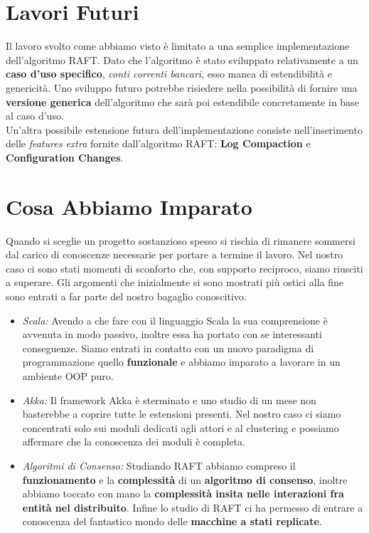 \section{Lavori Futuri}
  Il lavoro svolto come abbiamo visto è limitato a una semplice implementazione dell'algoritmo RAFT. Dato che l'algoritmo è stato sviluppato relativamente a un \textbf{caso d'uso specifico}, \textit{conti correnti bancari}, esso manca di estendibilità e genericità. Uno sviluppo futuro potrebbe risiedere nella possibilità di fornire una \textbf{versione generica} dell'algoritmo che sarà poi estendibile concretamente in base al caso d'uso.\\
  Un'altra possibile estensione futura dell'implementazione consiste nell'inserimento delle \textit{features extra} fornite dall'algoritmo RAFT: \textbf{Log Compaction} e \textbf{Configuration Changes}.

\section{Cosa Abbiamo Imparato}
  Quando si sceglie un progetto sostanzioso spesso si rischia di rimanere sommersi dal carico di conoscenze necessarie per portare a termine il lavoro. Nel nostro caso ci sono stati momenti di sconforto che, con supporto reciproco, siamo riusciti a superare. Gli argomenti che inizialmente si sono mostrati più ostici alla fine sono entrati a far parte del nostro bagaglio conoscitivo.
  \begin{itemize}
    \item{\emph{Scala:}}
    Avendo a che fare con il linguaggio Scala la sua comprensione è avvenuta in modo passivo, inoltre essa ha portato con se interessanti conseguenze. Siamo entrati in contatto con un nuovo paradigma di programmazione quello \textbf{funzionale} e abbiamo imparato a lavorare in un ambiente OOP puro.
    \item{\emph{Akka:}}
    Il framework Akka è sterminato e uno studio di un mese non basterebbe a coprire tutte le estensioni presenti. Nel nostro caso ci siamo concentrati solo sui moduli dedicati agli attori e al clustering e possiamo affermare che la conoscenza dei moduli è completa.
    \item{\emph{Algoritmi di Consenso:}}
    Studiando RAFT abbiamo compreso il \textbf{funzionamento} e la \textbf{complessità} di un \textbf{algoritmo di consenso}, inoltre abbiamo toccato con mano la \textbf{complessità insita nelle interazioni fra entità nel distribuito}. Infine lo studio di RAFT ci ha permesso di entrare a conoscenza del fantastico mondo delle \textbf{macchine a stati replicate}.
  \end{itemize}


